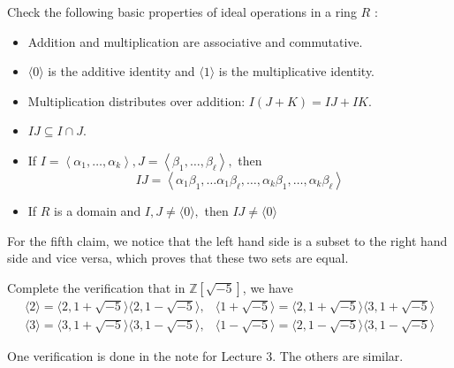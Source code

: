 \documentclass[12pt,twoside=semi,openright,numbers=noenddot]{scrbook}
\begin{document}
\begin{problem}
    Check the following basic properties of ideal operations in a ring $R$ :
    \begin{itemize}
        \item Addition and multiplication are associative and commutative.
        \item $\langle 0\rangle$ is the additive identity and $\langle 1\rangle$ is the multiplicative identity.
        \item Multiplication distributes over addition: $I(J+K)=IJ+IK$.
        \item $I J \subseteq I \cap J$.
        \item If $I=\left\langle\alpha_{1}, \ldots, \alpha_{k}\right\rangle, J=\left\langle\beta_{1}, \ldots, \beta_{\ell}\right\rangle,$ then
        \[
        I J=\left\langle\alpha_{1} \beta_{1}, \ldots \alpha_{1} \beta_{\ell}, \ldots, \alpha_{k} \beta_{1}, \ldots, \alpha_{k} \beta_{\ell}\right\rangle
        \]
        \item If $R$ is a domain and $I, J \neq\langle 0\rangle,$ then $I J \neq\langle 0\rangle$
    \end{itemize}
\end{problem}
    For the fifth claim, we notice that the left hand side is a subset to the right hand side and vice versa, which proves that these two sets are equal.

\begin{problem}
    Complete the verification that in $\mathbb{Z}[\sqrt{-5}]$, we have
    \[
    \begin{array}{ll}
    \langle 2\rangle=\langle 2,1+\sqrt{-5}\rangle\langle 2,1-\sqrt{-5}\rangle, & \langle 1+\sqrt{-5}\rangle=\langle 2,1+\sqrt{-5}\rangle\langle 3,1+\sqrt{-5}\rangle \\
    \langle 3\rangle=\langle 3,1+\sqrt{-5}\rangle\langle 3,1-\sqrt{-5}\rangle, & \langle 1-\sqrt{-5}\rangle=\langle 2,1-\sqrt{-5}\rangle\langle 3,1-\sqrt{-5}\rangle
    \end{array}
    \]
\end{problem}
    One verification is done in the note for Lecture 3. The others are similar.
    
\end{document}
